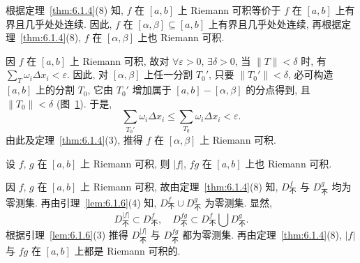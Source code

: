 \begin{solution}[证法 1]
根据定理~\ref{thm:6.1.4}(8) 知, $f$ 在 $[a,b]$ 上 Riemann 可积等价于 $f$ 在 $[a,b]$ 上有界且几乎处处连续. 因此, $f$ 在 $[\alpha,\beta]\subseteq[a,b]$ 上有界且几乎处处连续, 再根据定理~\ref{thm:6.1.4}(8), $f$ 在 $[\alpha,\beta]$ 上也 Riemann 可积.
\end{solution}

\begin{solution}[证法 2]
因 $f$ 在 $[a,b]$ 上 Riemann 可积, 故对 $\forall\varepsilon>0$, $\exists\delta>0$, 当 $\|T\|<\delta$ 时, 有 $\sum\limits_{T}\omega_{i}\Delta x_{i}<\varepsilon$. 因此, 对 $[\alpha,\beta]$ 上任一分割 $T_{0}'$, 只要 $\|T_{0}'\|<\delta$, 必可构造 $[a,b]$ 上的分割 $T_{0}$, 它由 $T_{0}'$ 增加属于 $[a,b]-[\alpha,\beta]$ 的分点得到, 且 $\|T_{0}\|<\delta$ (图~\ref{fig:6.1.7}). 于是,
\[
\sum_{T_{0}'}\omega_{i}\Delta x_{i}\leqslant\sum_{T_{0}}\omega_{i}\Delta x_{i}<\varepsilon.
\]
由此及定理~\ref{thm:6.1.4}(3), 推得 $f$ 在 $[\alpha,\beta]$ 上 Riemann 可积.
\end{solution}

\begin{figure}[htbp]
\centering
{}
\caption{}\label{fig:6.1.7}
\end{figure}

\begin{example}\label{ex:6.1.9}
设 $f$, $g$ 在 $[a,b]$ 上 Riemann 可积, 则 $|f|$, $fg$ 在 $[a,b]$ 上也 Riemann 可积.
\end{example}

\begin{solution}[证法 1]
因 $f$, $g$ 在 $[a,b]$ 上 Riemann 可积, 故由定理~\ref{thm:6.1.4}(8) 知, $D_{\text{不}}^{f}$ 与 $D_{\text{不}}^{g}$ 均为零测集. 再由引理~\ref{lem:6.1.6}(4) 知, $D_{\text{不}}^{f}\cup D_{\text{不}}^{g}$ 为零测集. 显然,
\[
D_{\text{不}}^{|f|}\subset D_{\text{不}}^{f},\quad D_{\text{不}}^{fg}\subset D_{\text{不}}^{f}\bigcup D_{\text{不}}^{g}.
\]
根据引理~\ref{lem:6.1.6}(3) 推得 $D_{\text{不}}^{|f|}$ 与 $D_{\text{不}}^{fg}$ 都为零测集. 再由定理~\ref{thm:6.1.4}(8), $|f|$ 与 $fg$ 在 $[a,b]$ 上都是 Riemann 可积的.
\end{solution}

